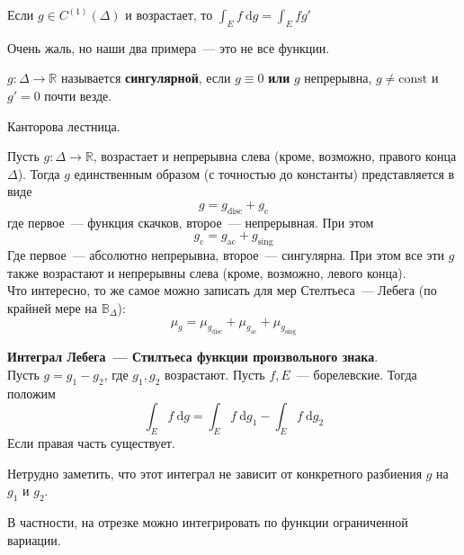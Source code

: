 \documentclass{article}
\begin{document}
    \begin{corollary}
        Если $g\in C^{(1)}(\Delta)$ и возрастает, то $\int_Ef~\mathrm dg=\int_Efg'$
    \end{corollary}
    \begin{remark}
        Очень жаль, но наши два примера~--- это не все функции.
    \end{remark}
    \begin{definition}
        $g\colon\Delta\to\mathbb R$ называется \textbf{сингулярной}, если $g\equiv0$ \textbf{или} $g$ непрерывна, $g\neq\mathrm{const}$ и $g'=0$ почти везде.
    \end{definition}
    \begin{example}
        Канторова лестница.
    \end{example}
    \begin{claim}
        Пусть $g\colon\Delta\to\mathbb R$, возрастает и непрерывна слева (кроме, возможно, правого конца $\Delta$). Тогда $g$ единственным образом (с точностью до константы) представляется в виде
        $$
        g=g_{\mathrm{disc}}+g_{\mathrm{c}}
        $$
        где первое~--- функция скачков, второе~--- непрерывная. При этом
        $$
        g_{\mathrm{c}}=g_{\mathrm{ac}}+g_{\mathrm{sing}}
        $$
        Где первое~--- абсолютно непрерывна, второе~--- сингулярна. При этом все эти $g$ также возрастают и непрерывны слева (кроме, возможно, левого конца).\\
        Что интересно, то же самое можно записать для мер Стелтьеса~--- Лебега (по крайней мере на $\mathbb B_\Delta$):
        $$
        \mu_g=\mu_{g_{\mathrm{disc}}}+\mu_{g_{\mathrm{ac}}}+\mu_{g_{\mathrm{sing}}}
        $$
    \end{claim}
    \begin{definition}
        \textbf{Интеграл Лебега~--- Стилтьеса функции произвольного знака}.\\
        Пусть $g=g_1-g_2$, где $g_1,g_2$ возрастают. Пусть $f,E$~--- борелевские. Тогда положим
        $$
        \int_Ef~\mathrm dg=\int_Ef~\mathrm dg_1-\int_Ef~\mathrm dg_2
        $$
        Если правая часть существует.
    \end{definition}
    \begin{property}
        Нетрудно заметить, что этот интеграл не зависит от конкретного разбиения $g$ на $g_1$ и $g_2$.
    \end{property}
    \begin{remark}
        В частности, на отрезке можно интегрировать по функции ограниченной вариации.
    \end{remark}
\end{document}
